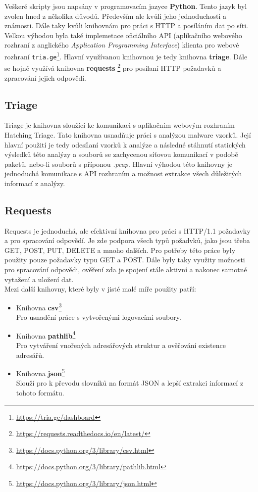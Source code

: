 Veškeré skripty jsou napsány v programovacím jazyce \textbf{Python}. Tento jazyk byl zvolen hned z několika důvodů.
Především ale kvůli jeho jednoduchosti a známosti. Dále taky kvůli knihovnám pro práci s HTTP a posíláním dat po síti.
Velkou výhodou byla také implemetace oficiálního API (aplikačního webového rozhraní z anglického \textit{Application Programming Interface}) klienta pro webové rozhraní 
\texttt{tria.ge}\footnote{\href{https://tria.ge/dashboard}{https://tria.ge/dashboard}}. 
Hlavní využívanou knihovnou je tedy knihovna \textbf{triage}. Dále se hojně využívá knihovna \textbf{requests} \footnote{\href{https://requests.readthedocs.io/en/latest/}{https://requests.readthedocs.io/en/latest/}}
pro posílaní HTTP požadavků a zpracování jejich odpovědí.

\subsection*{Triage}
Triage je knihovna sloužící ke komunikaci s aplikačním webovým rozhraním Hatching Triage. Tato knihovna usnadňuje práci s analýzou malware vzorků.
Její hlavní použití je tedy odesílaní vzorků k analýze a následné stáhnutí statických výsledků této analýzy a souborů se zachycenou síťovou komunikací v 
podobě paketů, nebo-li souborů s příponou \textit{.pcap}. Hlavní výhodou této knihovny je jednoduchá komunikace s API rozhraním a možnost extrakce všech důležitých
informací z analýzy.

\subsection*{Requests}
Requests je jednoduchá, ale efektivní knihovna pro práci s HTTP/1.1 požadavky a pro spracování odpovědí. Je zde podpora všech typů požadvků, jako jsou
třeba GET, POST, PUT, DELETE a mnoho dalších. Pro potřeby této práce byly použity pouze požadavky typu GET a POST. Dále byly taky využity možnosti
pro spracování odpovědi, ověření zda je spojení stále aktivní a nakonec samotné vytažení a uložení dat.\\ 

Mezi další knihovny, které byly v jisté malé míře použity patří:
\begin{itemize}
    \item Knihovna \textbf{csv}\footnote{\href{https://docs.python.org/3/library/csv.html}{https://docs.python.org/3/library/csv.html}}\\Pro usnadění práce s vytvořenými logovacími soubory.
    \item Knihovna \textbf{pathlib}\footnote{\href{https://docs.python.org/3/library/pathlib.html}{https://docs.python.org/3/library/pathlib.html}}\\Pro vytváření vnořených adresářových struktur a ověřování existence adresářů.
    \item Knihovna \textbf{json}\footnote{\href{https://docs.python.org/3/library/json.html}{https://docs.python.org/3/library/json.html}}\\Slouží pro k převodu slovníků na formát JSON a lepší extrakci informací z tohoto formátu.
\end{itemize}



